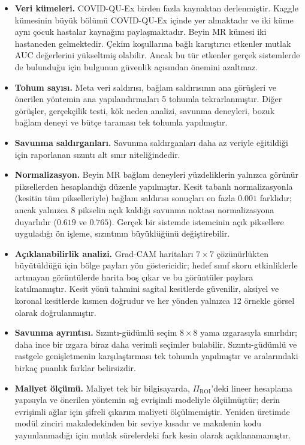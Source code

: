 \begin{itemize}
\item \textbf{Veri kümeleri.} COVID-QU-Ex birden fazla kaynaktan derlenmiştir. Kaggle kümesinin büyük bölümü COVID-QU-Ex içinde yer almaktadır ve iki küme aynı çocuk hastalar kaynağını paylaşmaktadır. Beyin MR kümesi iki hastaneden gelmektedir. Çekim koşullarına bağlı karıştırıcı etkenler mutlak AUC değerlerini yükseltmiş olabilir. Ancak bu tür etkenler gerçek sistemlerde de bulunduğu için bulgunun güvenlik açısından önemini azaltmaz.
\item \textbf{Tohum sayısı.} Meta veri saldırısı, bağlam saldırısının ana görüşleri ve önerilen yöntemin ana yapılandırmaları 5 tohumla tekrarlanmıştır. Diğer görüşler, gerçekçilik testi, kök neden analizi, savunma deneyleri, bozuk bağlam deneyi ve bütçe taraması tek tohumla yapılmıştır.
\item \textbf{Savunma saldırganları.} Savunma saldırganları daha az veriyle eğitildiği için raporlanan sızıntı alt sınır niteliğindedir.
\item \textbf{Normalizasyon.} Beyin MR bağlam deneyleri yüzdeliklerin yalnızca görünür piksellerden hesaplandığı düzenle yapılmıştır. Kesit tabanlı normalizasyonla (kesitin tüm pikselleriyle) bağlam saldırısı sonuçları en fazla $0.001$ farklıdır; ancak yalnızca 8 pikselin açık kaldığı savunma noktası normalizasyona duyarlıdır ($0.619$ ve $0.765$). Gerçek bir sistemde istemcinin açık piksellere uyguladığı ön işleme, sızıntının büyüklüğünü değiştirebilir.
\item \textbf{Açıklanabilirlik analizi.} Grad-CAM haritaları $7 \times 7$ çözünürlükten büyütüldüğü için bölge payları yön göstericidir; hedef sınıf skoru etkinliklerle artmayan görüntülerde harita boş çıkar ve bu görüntüler paylara katılmamıştır. Kesit yönü tahmini sagital kesitlerde güvenilir, aksiyel ve koronal kesitlerde kısmen doğrudur ve her yönden yalnızca 12 örnekle görsel olarak doğrulanmıştır.
\item \textbf{Savunma ayrıntısı.} Sızıntı-güdümlü seçim $8 \times 8$ yama ızgarasıyla sınırlıdır; daha ince bir ızgara biraz daha verimli seçimler bulabilir. Sızıntı-güdümlü ve rastgele genişletmenin karşılaştırması tek tohumla yapılmıştır ve aralarındaki birkaç puanlık farklar belirsizdir.
\item \textbf{Maliyet ölçümü.} Maliyet tek bir bilgisayarda, $\Pi_{\mathrm{ROI}}$'deki lineer hesaplama yapısıyla ve önerilen yöntemin sığ evrişimli modeliyle ölçülmüştür; derin evrişimli ağlar için şifreli çıkarım maliyeti ölçülmemiştir. Yeniden üretimde modül zinciri makaledekinden bir seviye kısadır ve makalenin kodu yayımlanmadığı için mutlak sürelerdeki fark kesin olarak açıklanamamıştır.

\end{itemize}

